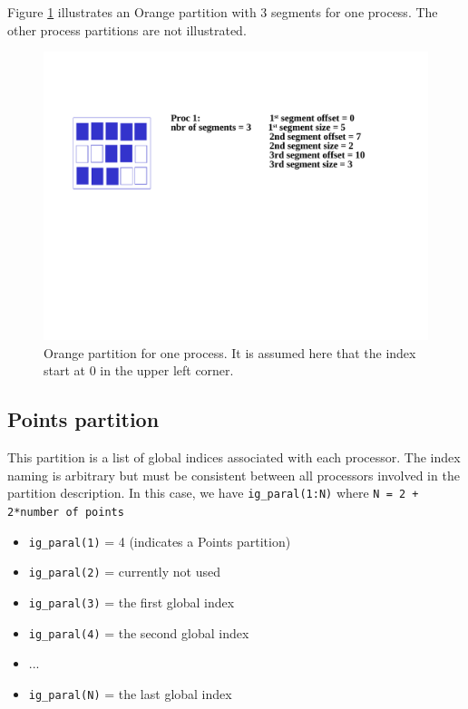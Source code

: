 Figure \ref{orange_partition} illustrates an Orange partition with 3
segments for one process. The other process partitions are not
illustrated.

\begin{figure}
  \includegraphics[scale=.6]{figures/orange_new}
  \caption{Orange partition for one process. It is assumed here that
    the index start at 0 in the upper left corner.}
  \label{orange_partition}
\end{figure}

\subsection{Points partition}

This partition is a list of global indices associated with each
processor.  The index naming
is arbitrary but must be consistent between all processors involved
in the partition description.  In
this case, we have {\tt ig\_paral(1:N)} where {\tt N = 2 + 2*number of
  points}

\begin{itemize}
\item {\tt ig\_paral(1)} = 4 (indicates a Points partition)
\item {\tt ig\_paral(2)} = currently not used
\item {\tt ig\_paral(3)} = the first global index
\item {\tt ig\_paral(4)} = the second global index
\item ...
\item {\tt ig\_paral(N)} = the last global index
\end{itemize}

